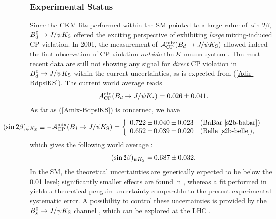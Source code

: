 \documentclass[12pt]{article}
\begin{document}
\subsubsection{Experimental Status}
%
%
%
Since the CKM fits performed within the SM pointed to a large value of 
$\sin2\beta$, $B^0_d\to J/\psi K_{\rm S}$ offered the exciting perspective 
of exhibiting {\it large} mixing-induced CP violation. In 2001, the measurement of  
${\cal A}^{\mbox{{\scriptsize mix}}}_{\mbox{{\scriptsize CP}}}
(B_d\to J/\psi K_{\mbox{{\scriptsize S}}})$
allowed indeed the first observation of CP violation {\it outside} the 
$K$-meson system \cite{CP-B-obs}.
The most recent data are still not showing any signal for {\it direct} CP violation
in $B^0_d\to J/\psi K_{\rm S}$ within the current uncertainties, as is expected from 
(\ref{Adir-BdpsiKS}). The current world average reads \cite{HFAG}
\begin{equation}
{\cal A}_{\rm CP}^{\rm dir}(B_d\to J/\psi K_{\rm S})=0.026\pm0.041.
\end{equation}
As far as (\ref{Amix-BdpsiKS}) is concerned, we have
\begin{equation}\label{s2b-psiK-exp}
\hspace*{-2.0truecm}(\sin2\beta)_{\psi K_{\rm S}}\equiv 
-{\cal A}^{\mbox{{\scriptsize mix}}}_{\mbox{{\scriptsize
CP}}}(B_d\to J/\psi K_{\mbox{{\scriptsize S}}})
=\left\{
\begin{array}{ll}
0.722\pm0.040\pm0.023 & \mbox{(BaBar \cite{s2b-babar})}\\
0.652\pm0.039\pm0.020 & \mbox{(Belle \cite{s2b-belle}),}
\end{array}
\right.
\end{equation}
which gives the following world average \cite{HFAG}:
\begin{equation}\label{s2b-average}
(\sin 2\beta)_{\psi K_{\rm S}}=0.687\pm0.032.
\end{equation}
In the SM, the theoretical uncertainties are generically expected to be
below the 0.01 level; significantly smaller effects are found in \cite{BMR}, 
whereas a fit performed in \cite{CPS} yields a theoretical penguin uncertainty 
comparable to the present experimental systematic error. A possibility
to control these uncertainties is provided by the $B^0_s\to J/\psi K_{\rm S}$ 
channel \cite{RF-BdsPsiK}, which can be explored at the LHC \cite{LHC-Book}.
\end{document}
